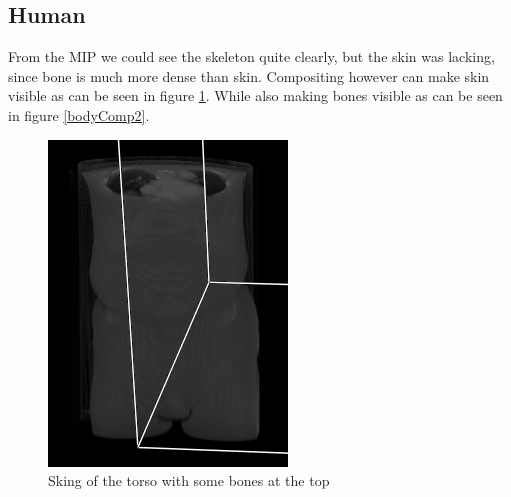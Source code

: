 \documentclass[a4paper,twoside,11pt]{article}
\begin{document}
 \subsection{Human}
 From the MIP we could see the skeleton quite clearly, but the skin was lacking, since bone is much more dense than skin. Compositing however can make skin visible as can be seen in figure \ref{bodyComp}. While also making bones visible as can be seen in figure \ref{bodyComp2}.
    \begin{figure}[H]
  \includegraphics[width=\linewidth]{images/bodyComp}
  \caption{Sking of the torso with some bones at the top}\label{bodyComp}
\endminipage\hfill
{}

\end{figure}
\end{document}
